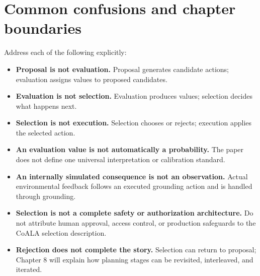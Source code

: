 \section{Common confusions and chapter boundaries}
Address each of the following explicitly:
\begin{itemize}
  \item \textbf{Proposal is not evaluation.} Proposal generates candidate actions; evaluation assigns values to proposed candidates.
  \item \textbf{Evaluation is not selection.} Evaluation produces values; selection decides what happens next.
  \item \textbf{Selection is not execution.} Selection chooses or rejects; execution applies the selected action.
  \item \textbf{An evaluation value is not automatically a probability.} The paper does not define one universal interpretation or calibration standard.
  \item \textbf{An internally simulated consequence is not an observation.} Actual environmental feedback follows an executed grounding action and is handled through grounding.
  \item \textbf{Selection is not a complete safety or authorization architecture.} Do not attribute human approval, access control, or production safeguards to the CoALA selection description.
  \item \textbf{Rejection does not complete the story.} Selection can return to proposal; Chapter 8 will explain how planning stages can be revisited, interleaved, and iterated.
\end{itemize}

